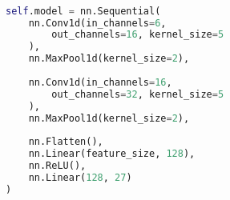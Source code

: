 \begin{lstlisting}[language=Python, caption={CNN architecture}]

self.model = nn.Sequential(
	nn.Conv1d(in_channels=6, 
		out_channels=16, kernel_size=5
	),
	nn.MaxPool1d(kernel_size=2),
	
	nn.Conv1d(in_channels=16,
		out_channels=32, kernel_size=5
	),
	nn.MaxPool1d(kernel_size=2),
	
	nn.Flatten(),
	nn.Linear(feature_size, 128),
	nn.ReLU(),
	nn.Linear(128, 27)
)
\end{lstlisting}